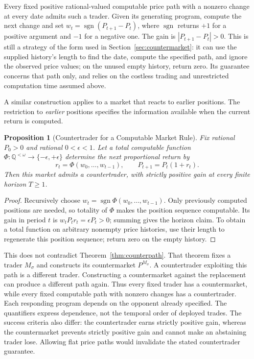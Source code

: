 \documentclass[aps,pra,reprint,superscriptaddress,amsmath,amssymb,floatfix]{revtex4-2}
\theoremstyle{plain}
\newtheorem{proposition}[theorem]{Proposition}
\theoremstyle{definition}
\theoremstyle{remark}
\begin{document}
Every fixed positive rational-valued computable price path with a nonzero
change at every date admits such a trader. Given its generating program,
compute the next change and set
\(w_t=\operatorname{sgn}(P_{t+1}-P_t)\), where
\(\operatorname{sgn}\) returns \(+1\) for a positive argument and \(-1\) for a
negative one. The gain is \(|P_{t+1}-P_t|>0\).
This is still a strategy of the form used in
Section~\ref{sec:countermarket}: it can use the supplied history's length to
find the date, compute the specified path, and ignore the observed price
values; on the unused empty history, return zero. Its guarantee concerns
that path only, and relies on the costless
trading and unrestricted computation time assumed above.

A similar construction applies to a market that reacts to earlier positions.
The restriction to \emph{earlier} positions specifies the information available
when the current return is computed.

\begin{proposition}[Countertrader for a Computable Market Rule]
\label{prop:countertrader}
Fix rational \(P_0>0\) and rational \(0<\epsilon<1\).
Let a total computable function
\(\Phi\colon\mathbb Q^{<\omega}\to\{-\epsilon,+\epsilon\}\)
determine the next proportional return by
\[
  r_t=\Phi(w_0,\ldots,w_{t-1}),\qquad
  P_{t+1}=P_t(1+r_t).
\]
Then this market admits a countertrader, with strictly positive gain at
every finite horizon \(T\geq1\).
\end{proposition}

\begin{proof}
Recursively choose
\(w_t=\operatorname{sgn}\Phi(w_0,\ldots,w_{t-1})\).
Only previously computed positions are needed, so totality of \(\Phi\)
makes the position sequence computable. Its gain in period \(t\) is
\(w_tP_tr_t=\epsilon P_t>0\); summing gives the horizon claim.
To obtain a total function on arbitrary nonempty price histories, use their
length to regenerate this position sequence; return zero on the empty history.
\end{proof}

This does not contradict Theorem~\ref{thm:counterpath}.
That theorem fixes a trader \(M_\sigma\) and constructs its countermarket
\(P^{M_\sigma}\). A countertrader exploiting this path is a different trader.
Constructing a countermarket against the replacement can produce a different
path again. Thus every fixed trader has a countermarket, while every fixed
computable path with nonzero changes has a countertrader.
Each responding program depends on the opponent already specified.
The quantifiers express dependence, not the temporal order of deployed trades.
The success criteria also differ: the countertrader earns strictly positive
gain, whereas the countermarket prevents strictly positive gain and cannot
make an abstaining trader lose. Allowing flat price paths would invalidate
the stated countertrader guarantee.
\end{document}
